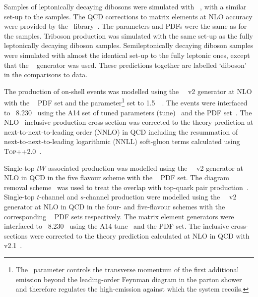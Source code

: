 \documentclass[atlasdraft=false, cernpreprint, UKenglish, texmf, orcidlogo]{atlasdoc}
\begin{document}
Samples of leptonically decaying dibosons were simulated with
\SHERPA[2.2.2]~\cite{Gleisberg:2008ta}, with a similar set-up to the \vjets samples\cite{ATL-PHYS-PUB-2017-005}.
The QCD corrections to matrix elements at NLO accuracy were
provided by the \OPENLOOPS\ library~\cite{Cascioli:2011va,Denner:2016kdg}.
The parameters and PDFs were the same as for the \vjets samples.
Triboson production was simulated with the same set-up as the fully leptonically decaying diboson samples.
Semileptonically decaying diboson samples were simulated with almost the identical set-up to the fully leptonic ones,
except that the \SHERPA[2.2.1]~\cite{Gleisberg:2008ta} generator was used.
These predictions together are labelled `diboson' in the comparisons to data.
 
The production of on-shell \ttbar events was modelled using the
\POWHEGBOX~\cite{Frixione:2007nw,Nason:2004rx,Frixione:2007vw,Alioli:2010xd}~v2
generator at NLO with the \NNPDF[3.0nlo]~\cite{Ball:2014uwa} PDF set
and the \hdamp parameter\footnote{The \hdamp\ parameter controls the transverse momentum \pt of the first additional emission
beyond the leading-order Feynman diagram in the parton shower and therefore regulates the  high-\pt emission against which the
\ttbar system recoils.} set to 1.5~\mtop~\cite{ATL-PHYS-PUB-2016-020}.
The events were interfaced to \PYTHIA~8.230~\cite{Sjostrand:2014zea}
using the A14 set of tuned parameters (tune)~\cite{ATL-PHYS-PUB-2014-021} and the \NNPDF[2.3lo] PDF set~\cite{Ball:2012cx}.
The NLO \ttbar\ inclusive production cross-section was corrected to the theory prediction at next-to-next-to-leading order (NNLO)
in QCD including the resummation of next-to-next-to-leading logarithmic (NNLL) soft-gluon terms calculated using
\textsc{Top++2.0}~\cite{Beneke:2011mq,Cacciari:2011hy,Baernreuther:2012ws,Czakon:2012zr,Czakon:2012pz,Czakon:2013goa,Czakon:2011xx}.
 
Single-top $tW$ associated production was modelled using the \POWHEGBOX~\cite{Re:2010bp,Nason:2004rx,Frixione:2007vw,Alioli:2010xd}~v2
generator at NLO in QCD in the five flavour scheme with the \NNPDF[3.0nlo]~\cite{Ball:2014uwa} PDF set.
The diagram removal scheme~\cite{Frixione:2008yi} was used to treat the overlap with top-quark pair
production~\cite{ATL-PHYS-PUB-2016-020}.
Single-top $t$-channel and $s$-channel production were modelled using the
\POWHEGBOX~\cite{Frederix:2012dh,Nason:2004rx,Frixione:2007vw,Alioli:2009je,Alioli:2010xd}~v2
generator at NLO in QCD in the four- and five-flavour schemes with the corresponding \NNPDF[3.0nlo]~\cite{Ball:2014uwa} PDF sets respectively.
The matrix element generators were interfaced to \PYTHIA~8.230~\cite{Sjostrand:2014zea} using the A14 tune~\cite{ATL-PHYS-PUB-2014-021}
and the \NNPDF[2.3lo] PDF set. The inclusive cross-sections were corrected to the theory prediction calculated at
NLO in QCD with \HATHOR v2.1~\cite{Aliev:2010zk,Kant:2014oha}.
 
\end{document}
